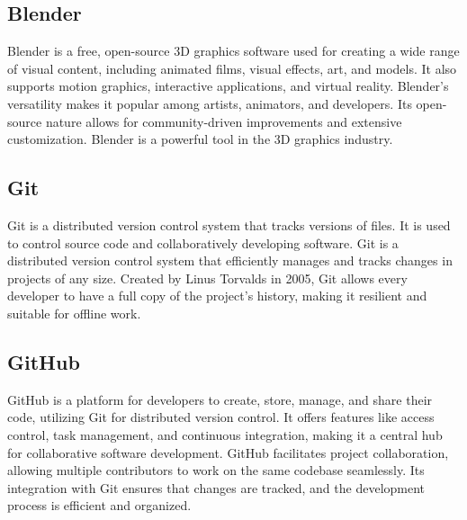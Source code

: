 \subsection{Blender}
Blender is a free, open-source 3D graphics software used for creating a wide range of visual content, including animated films, visual effects, art, and models. It also supports motion graphics, interactive applications, and virtual reality. Blender's versatility makes it popular among artists, animators, and developers. Its open-source nature allows for community-driven improvements and extensive customization. Blender is a powerful tool in the 3D graphics industry.
\subsection{Git}
Git is a distributed version control system that tracks versions of files. It is used to control source code and collaboratively developing software. Git is a distributed version control system that efficiently manages and tracks changes in projects of any size. Created by Linus Torvalds in 2005, Git allows every developer to have a full copy of the project’s history, making it resilient and suitable for offline work.
\newpage
\subsection{GitHub}
GitHub is a platform for developers to create, store, manage, and share their code, utilizing Git for distributed version control. It offers features like access control, task management, and continuous integration, making it a central hub for collaborative software development. GitHub facilitates project collaboration, allowing multiple contributors to work on the same codebase seamlessly. Its integration with Git ensures that changes are tracked, and the development process is efficient and organized.
